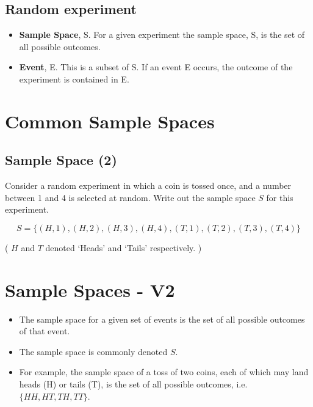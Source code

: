 \documentclass[]{report}
\begin{document}
{{{\subsection{Random experiment}
\begin{itemize}
\item \textbf{Sample Space}, S. For a given experiment the sample space, S, is the set of all
possible outcomes.
\item \textbf{Event}, E. This is a subset of S. If an event E occurs, the outcome of the experiment is contained in E.
\end{itemize}


\section{Common Sample Spaces}



\subsection{Sample Space (2)}
Consider a random experiment in which a coin is tossed once, and a number between 1 and 4 is selected at random.
Write out the sample space $S$ for this experiment.

\bigskip

\[ S = \{(H,1),(H,2),(H,3),(H,4),(T,1),(T,2),(T,3),(T,4)\} \]

( $H$ and $T$ denoted `Heads' and `Tails' respectively. )

\newpage


\section{Sample Spaces - V2}
{


\begin{itemize}

\item The sample space for a given set of events is the set of all possible outcomes of that event. 

\item The sample space is commonly denoted $S$.

\item 
For example, the sample space of a toss of two coins, each of which may land heads (H) or tails (T), is the set of all possible outcomes, i.e. $\{HH, HT, TH,TT\}$.


\end{itemize}}}}}
\end{document}
